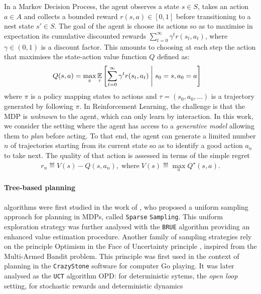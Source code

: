 \documentclass[runningheads]{llncs}
\begin{document}
In a Markov Decision Process, the agent observes a state $s\in S$, takes an action $a\in A$ and collects a bounded reward $r(s, a)\in[0, 1]$ before transitioning to a nest state $s'\in S$. The goal of the agent is choose its actions so as to maximise in expectation its cumulative discounted rewards $\sum_{t=0}^\infty \gamma^t r(s_t, a_t)$, where $\gamma\in(0, 1)$ is a discount factor. This amounts to choosing at each step the action that maximises the state-action value function $Q$ defined as:
\begin{align*}
Q(s, a) &= \max_\pi  \operatorname*{\mathbb{E}}_\tau \left[\sum_{t=0}^\infty \gamma^t r(s_t, a_t)\;\middle|\; s_0 = s, a_0 = a\right]
\end{align*}
where $\pi$ is a policy mapping states to actions and $\tau = (s_0, a_0, \dots)$ is a trajectory generated by following $\pi$. In Reinforcement Learning, the challenge is that the MDP is \emph{unknown} to the agent, which can only learn by interaction. In this work, we consider the setting where the agent has access to a \emph{generative model} allowing them to \emph{plan} before acting. To that end, the agent can generate a limited number $n$ of trajectories starting from its current state so as to identify a good action $a_n$ to take next.
The quality of that action is assessed in terms of the simple regret
\begin{align*}
	r_n \eqdef V(s) - Q(s, {a}_n), \; \mbox{where} \; V(s) \eqdef  \max_a Q^\star(s, a).
\end{align*}

\paragraph{Tree-based planning} algorithms were first studied in the work of \cite{Kearns02SS}, who proposed a uniform sampling approach for planning in MDPs, called \texttt{Sparse} \texttt{Sampling}. This uniform exploration strategy was further analysed with the \texttt{BRUE} algorithm
\cite{Feldman14BRUE} providing an enhanced value estimation procedure. Another family of sampling strategies rely on the principle Optimism in the Face of Uncertainty principle \citep[surveyed by][]{SurveyRemiMCTS}, inspired from the Multi-Armed Bandit problem. This principle was first used in the context of planning in the \texttt{CrazyStone} software \citep{Coulom2006} for computer Go playing. It was later analysed as the \texttt{UCT} algorithm 
OPD: \citep{hren2008optimistic} for deterministic sytems, 
the \emph{open loop} setting, for stochastic rewards and deterministic dynamics \citep{bubeck2010open,leurent2019practical}
\end{document}
